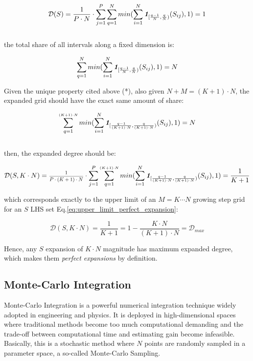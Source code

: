 \documentclass[12pt]{extarticle}
\newcommand{\meqref}[1]{Eq.\ref{#1}}
\newcommand{\indfunc}[1]{\textit{\textbf{1}}_{#1}}
\begin{document}
\begin{equation*}
\mathcal{D}(S) = \frac{1}{P \cdot N} \cdot \sum^P_{j=1} \sum^N_{q=1} min(\sum^N_{i=1}\indfunc{[\frac{q-1}{N}, \frac{q}{N})}(S_{ij}), 1) = 1
\end{equation*}
\\
the total share of all intervals along a fixed dimension is:

\begin{equation*}
\sum^N_{q=1} min(\sum^N_{i=1}\indfunc{[\frac{q-1}{N}, \frac{q}{N})}(S_{ij}), 1) = N
\end{equation*}

Given the unique property cited above (*), also given $N + M = (K+1) \cdot N $, the expanded grid should have the exact same amount of share:

\begin{equation*}
\sum^{{\scriptscriptstyle (K+1) \cdot N}}_{q=1} min(\sum^{N}_{i=1}\indfunc{[\frac{q-1}{{(K+1) \cdot N}}, \frac{q}{(K+1) \cdot N})}(S_{ij}), 1) = N
\end{equation*}
\\
then, the expanded degree should be:

\begin{equation*}
\mathcal{D}(S, K \cdot N) = \text{\scalebox{0.75}{$\frac{1}{{P \cdot (K+1) \cdot N}}$}} \cdot \sum^P_{j=1}\sum^{{\scriptscriptstyle (K+1) \cdot N}}_{q=1} min(\sum^{N}_{i=1}\indfunc{[\frac{q-1}{{(K+1) \cdot N}}, \frac{q}{(K+1) \cdot N})}(S_{ij}), 1) = \frac{1}{K+1}
\end{equation*}

which corresponds exactly to the upper limit of an $M = K \cdots N$ growing step grid for an $S$ LHS set \meqref{eq:upper_limit_perfect_expansion}: 

\begin{equation*}
\mathcal{D}(S, K \cdot N) = \frac{1}{K+1} = 1 - \frac{K \cdot N}{(K+1) \cdot N} = \mathcal{D}_{max}
\end{equation*}

Hence, any $S$ expansion of $K \cdot N$ magnitude has maximum expanded degree, which makes them \textit{perfect expansions} by definition.

\subsection{Monte-Carlo Integration}
\label{appendix:montecarlo_integration}
Monte-Carlo Integration is a powerful numerical integration technique widely adopted in engineering and physics. It is deployed in high-dimensional spaces where traditional methods become too much computational demanding and the trade-off between computational time and estimating gain become infeasible. Basically, this is a stochastic method where $N$ points are randomly sampled in a parameter space, a so-called Monte-Carlo Sampling. 
\end{document}
